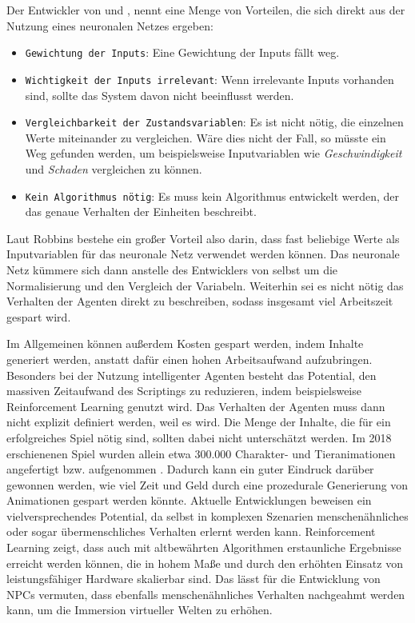 Der Entwickler von  und , nennt eine Menge von Vorteilen, die sich direkt aus der Nutzung eines neuronalen Netzes ergeben:

\begin{itemize}
    \item \texttt{Gewichtung der Inputs}: Eine Gewichtung der Inputs fällt weg.
    \item \texttt{Wichtigkeit der Inputs irrelevant}: Wenn irrelevante Inputs vorhanden sind, sollte das System davon nicht beeinflusst werden.
    \item \texttt{Vergleichbarkeit der Zustandsvariablen}: Es ist nicht nötig, die einzelnen Werte miteinander zu vergleichen. Wäre dies nicht der Fall, so müsste ein Weg gefunden werden, um beispielsweise Inputvariablen wie \textit{Geschwindigkeit} und \textit{Schaden} vergleichen zu können.
    \item \texttt{Kein Algorithmus nötig}: Es muss kein Algorithmus entwickelt werden, der das genaue Verhalten der Einheiten beschreibt.
\end{itemize}

Laut Robbins bestehe ein großer Vorteil also darin, dass fast beliebige Werte als Inputvariablen für das neuronale Netz verwendet werden können. Das neuronale Netz kümmere sich dann anstelle des Entwicklers von selbst um die Normalisierung und den Vergleich der Variabeln. Weiterhin sei es nicht nötig das Verhalten der Agenten direkt zu beschreiben, sodass insgesamt viel Arbeitszeit gespart wird.

Im Allgemeinen können außerdem Kosten gespart werden, indem Inhalte generiert werden, anstatt dafür einen hohen Arbeitsaufwand aufzubringen. Besonders bei der Nutzung intelligenter Agenten besteht das Potential, den massiven Zeitaufwand des Scriptings zu reduzieren, indem beispielsweise Reinforcement Learning genutzt wird. Das Verhalten der Agenten muss dann nicht explizit definiert werden, weil es  wird.
Die Menge der Inhalte, die für ein erfolgreiches Spiel nötig sind, sollten dabei nicht unterschätzt werden. Im 2018 erschienenen Spiel  \cite{rdr2} wurden allein etwa 300.000 Charakter- und Tieranimationen angefertigt bzw. aufgenommen \cite{rdr2_script_pages}. Dadurch kann ein guter Eindruck darüber gewonnen werden, wie viel Zeit und Geld durch eine prozedurale Generierung von Animationen gespart werden könnte.
Aktuelle Entwicklungen beweisen ein vielversprechendes Potential, da selbst in komplexen Szenarien menschenähnliches oder sogar übermenschliches Verhalten erlernt werden kann. Reinforcement Learning zeigt, dass auch mit altbewährten Algorithmen erstaunliche Ergebnisse erreicht werden können, die in hohem Maße und durch den erhöhten Einsatz von leistungsfähiger Hardware skalierbar sind. Das lässt für die Entwicklung von NPCs vermuten, dass ebenfalls menschenähnliches Verhalten nachgeahmt werden kann, um die Immersion virtueller Welten zu erhöhen.